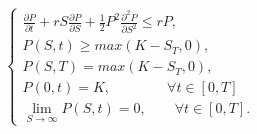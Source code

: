 \documentclass[a4paper,10pt]{report}
\newcommand{\der}[2]{\frac{\partial #1}{\partial #2}}
\newcommand{\dder}[2]{\frac{\partial^2 #1}{\partial #2^2}}
\theoremstyle{osservazione}
\theoremstyle{esempio}
\theoremstyle{notazione}
\theoremstyle{corollario}
\begin{document}
\begin{equation}
\begin{cases}
\displaystyle
\der{P}{t}+r S \der{P}{S} +\frac{1}{2}P^2\dder{P}{S}\leq rP,\\
P(S,t)\geq max(K-S_T,0),\\
P(S,T)=max(K-S_T,0),\\
P(0,t)=K,\qquad\qquad\forall t\in[0,T]\\
\lim\limits_{S\to\infty}P(S,t)=0,\qquad\forall t\in[0,T].
\end{cases}
\label{putam1d}
\end{equation}
\end{document}
